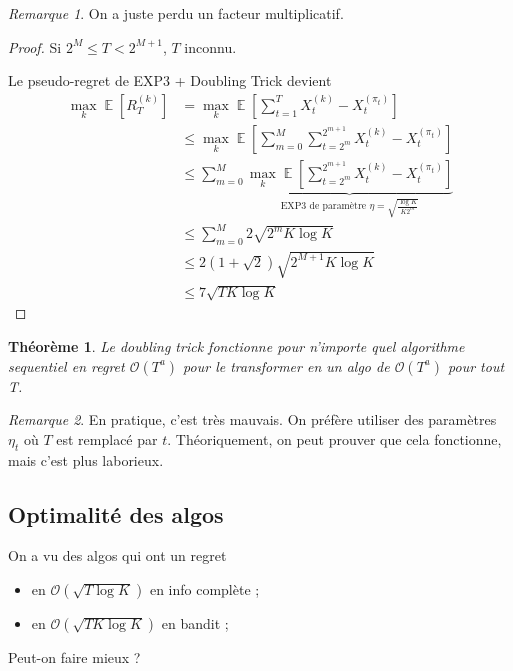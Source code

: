 \documentclass{article}
\DeclareMathOperator*{\E}{\mathbb{E}}
\newtheorem{theorem}{Théorème}[section]
\theoremstyle{remark}
\theoremstyle{remark}
\newtheorem{remark}{Remarque}[section]
\begin{document}
\begin{remark}
   On a juste perdu un facteur multiplicatif.
\end{remark}

\begin{proof}
   Si $2^M \leq T < 2^{M+1}$, $T$ inconnu.

   Le pseudo-regret de EXP3 + Doubling Trick devient
   \begin{align*}
      \max_k \E[R_T^{(k)}] &= \max_k \E\left[\sum_{t=1}^T X_t^{(k)} - X_t^{(\pi_t)} \right] \\
      &\leq \max_k \E\left[\sum_{m=0}^M  \sum_{t=2^m}^{2^{m+1}} X_t^{(k)} - X_t^{(\pi_t)} \right] \\
      &\leq \sum_{m=0}^M  \underbrace{\max_k \E\left[ \sum_{t=2^m}^{2^{m+1}} X_t^{(k)} - X_t^{(\pi_t)} \right]}_{\text{EXP3 de paramètre $\eta = \sqrt{\frac{\log K}{K 2^m}}$}} \\
      &\leq \sum_{m=0}^M 2 \sqrt{2^m K \log K} \\
      &\leq 2 (1+\sqrt{2}) \sqrt{2^{M+1} K \log K} \\
      &\leq 7 \sqrt{T K \log K}
   \end{align*}
\end{proof}

\begin{theorem}
   Le doubling trick fonctionne pour n'importe quel algorithme sequentiel en regret $\mathcal{O}(T^a)$ pour le transformer en un algo de $\mathcal{O}(T^a)$ pour tout T.
\end{theorem}

\begin{remark}
   En pratique, c'est très mauvais.
   On préfère utiliser des paramètres $\eta_t$ où $T$ est remplacé par $t$.
   Théoriquement, on peut prouver que cela fonctionne, mais c'est plus laborieux.
\end{remark}

\subsection{Optimalité des algos}

On a vu des algos qui ont un regret
\begin{itemize}
   \item en $\mathcal{O}(\sqrt{T \log K})$ en info complète ;
   \item en $\mathcal{O}(\sqrt{T K \log K})$ en bandit ;
\end{itemize}

Peut-on faire mieux ?
\end{document}
